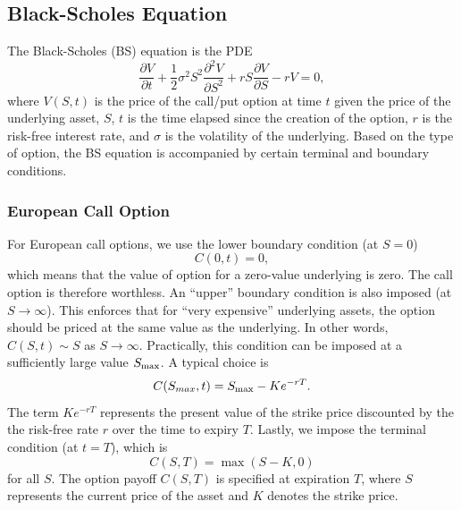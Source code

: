 \subsection{Black-Scholes Equation}\label{sec:bse}
The Black-Scholes (BS) equation is the PDE
\begin{equation}
\frac{\partial V}{\partial t} + \frac{1}{2} \sigma^2 S^2 \frac{\partial^2 V}{\partial S^2} + r S \frac{\partial V}{\partial S} - r V = 0, \label{eq:black-scholes}
\end{equation}
where \( V(S,t) \) is the price of the call/put option at time $t$ given the price of the underlying asset, $S$, 
$t$ is the time elapsed since the creation of the option, 
$r$ is the risk-free interest rate, and
$\sigma$ is the volatility of the underlying.
Based on the type of option, the BS equation is accompanied by certain terminal and boundary conditions.

\subsubsection{European Call Option}
For European call options, we use the lower boundary condition (at $S=0$)
\begin{equation}
        C(0,t) = 0, 
\end{equation}
which means that the value of option for a zero-value underlying is zero. The call option is
therefore worthless. An ``upper'' boundary condition is also imposed (at $S \rightarrow  \infty$).
This enforces that for ``very expensive'' underlying assets, the option should be priced at the same value as the underlying. 
In other words, $C(S,t) \sim S$ as $S \to  \infty$.
Practically, this condition can be imposed at a sufficiently
large value $S_{\rm max}$. A typical choice \cite{kwok_2008_derivatives} is 
\begin{equation}
        C(S_{max},t) = S_{\rm max} - Ke^{-rT}.
\end{equation}
The term $Ke^{-rT}$ represents the present value of the strike price discounted by the the risk-free
rate $r$ over the time to expiry $T$. Lastly, we impose the terminal condition (at $t = T$),
which is 
\begin{equation}
 C(S,T) = \max(S-K,0)  \label{eq:call-terminal} 
\end{equation}
for all $S$.
The option payoff $C(S,T)$ is specified at expiration $T$,
where $S$ represents the current price of the asset and $K$ denotes the strike price.

